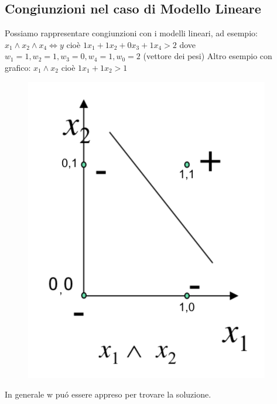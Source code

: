 \documentclass{article}
\begin{document}
\subsection{Congiunzioni nel caso di Modello Lineare}
Possiamo rappresentare congiunzioni con i modelli lineari, ad esempio:\newline
$x_1 \land x_2 \land x_4 \Leftrightarrow y$ cioè $1x_1+1x_2+0x_3+1x_4 > 2$ dove $w_1=1, w_2=1, w_3 = 0, w_4 = 1, w_0 = 2$ (vettore dei pesi)\newline
Altro esempio con grafico: \newline
$x_1 \land x_2$ cioè $1x_1+1x_2>1$
\begin{figure}[H]
\centering
\includegraphics[scale=0.5]{Images/conjunctionsgraph.png}
\end{figure}
In generale w puó essere appreso per trovare la soluzione.
\end{document}

